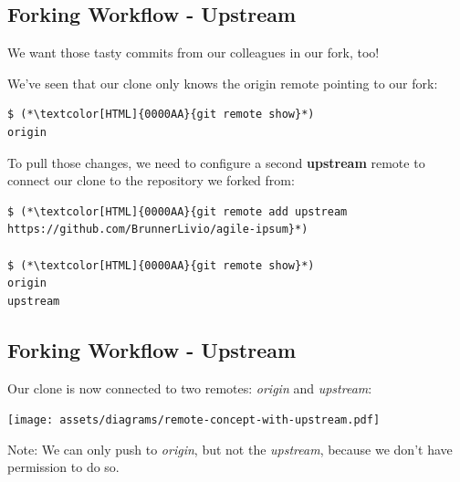 \subsection{Forking Workflow - Upstream}
\begin{frame}[fragile]
  \subslidetitle

  We want those tasty commits from our colleagues in our fork, too!

  We've seen that our clone only knows the origin remote pointing to our fork:

  \begin{lstlisting}
$ (*\textcolor[HTML]{0000AA}{git remote show}*)
origin
\end{lstlisting}

  To pull those changes, we need to configure a second \textbf{upstream} remote
  to connect our clone to the repository we forked from:

  \begin{lstlisting}
$ (*\textcolor[HTML]{0000AA}{git remote add upstream https://github.com/BrunnerLivio/agile-ipsum}*)

$ (*\textcolor[HTML]{0000AA}{git remote show}*)
origin
upstream
\end{lstlisting}

\end{frame}

\subsection{Forking Workflow - Upstream}
\begin{frame}[fragile]
  \subslidetitle

  Our clone is now connected to two remotes: \textit{origin} and \textit{upstream}:

  \vspace{3em}
  \centerline{\texttt{[image: assets/diagrams/remote-concept-with-upstream.pdf]}}

  \vspace{1em}
  Note: We can only push to \textit{origin}, but not the \textit{upstream}, because
  we don't have permission to do so.

\end{frame}

